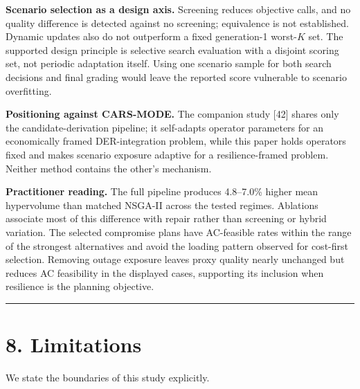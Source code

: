 \documentclass[
  10pt,
  a4paper,
]{article}
\begin{document}
\textbf{Scenario selection as a design axis.} Screening reduces
objective calls, and no quality difference is detected against no
screening; equivalence is not established. Dynamic updates also do not
outperform a fixed generation-1 worst-\(K\) set. The supported design
principle is selective search evaluation with a disjoint scoring set,
not periodic adaptation itself. Using one scenario sample for both
search decisions and final grading would leave the reported score
vulnerable to scenario overfitting.

\textbf{Positioning against CARS-MODE.} The companion study {[}42{]}
shares only the candidate-derivation pipeline; it self-adapts operator
parameters for an economically framed DER-integration problem, while
this paper holds operators fixed and makes scenario exposure adaptive
for a resilience-framed problem. Neither method contains the other's
mechanism.

\textbf{Practitioner reading.} The full pipeline produces 4.8--7.0\%
higher mean hypervolume than matched NSGA-II across the tested regimes.
Ablations associate most of this difference with repair rather than
screening or hybrid variation. The selected compromise plans have
AC-feasible rates within the range of the strongest alternatives and
avoid the loading pattern observed for cost-first selection. Removing
outage exposure leaves proxy quality nearly unchanged but reduces AC
feasibility in the displayed cases, supporting its inclusion when
resilience is the planning objective.

\begin{center}\rule{0.5\linewidth}{0.5pt}\end{center}

\section{8. Limitations}\label{limitations}

We state the boundaries of this study explicitly.
\end{document}
